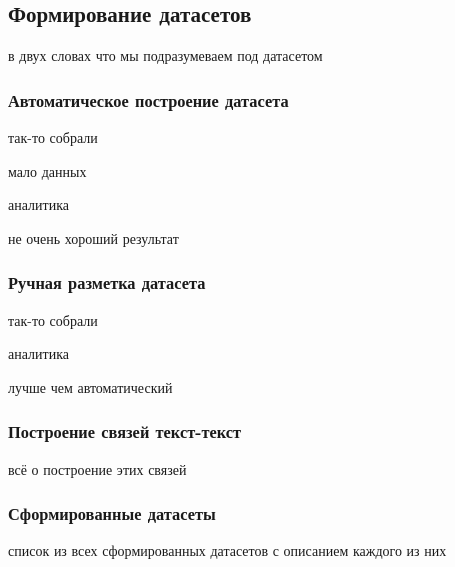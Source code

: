 \subsection{Формирование датасетов}
    в двух словах что мы подразумеваем под датасетом



    \subsubsection{Автоматическое построение датасета}
        так-то собрали

        мало данных

        аналитика

        не очень хороший результат

    \subsubsection{Ручная разметка датасета}
        так-то собрали

        аналитика

        лучше чем автоматический

    \subsubsection{Построение связей текст-текст}
        всё о построение этих связей

    \subsubsection{Сформированные датасеты}

        список из всех сформированных датасетов с описанием каждого из них

